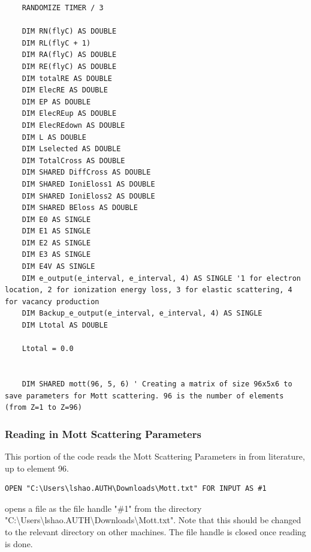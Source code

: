 \documentclass[10pt, reqno]{exam}
\begin{document}
{
\begin{verbatim}
    RANDOMIZE TIMER / 3
    
    DIM RN(flyC) AS DOUBLE
    DIM RL(flyC + 1)
    DIM RA(flyC) AS DOUBLE
    DIM RE(flyC) AS DOUBLE
    DIM totalRE AS DOUBLE
    DIM ElecRE AS DOUBLE
    DIM EP AS DOUBLE
    DIM ElecREup AS DOUBLE
    DIM ElecREdown AS DOUBLE
    DIM L AS DOUBLE
    DIM Lselected AS DOUBLE
    DIM TotalCross AS DOUBLE
    DIM SHARED DiffCross AS DOUBLE
    DIM SHARED IoniEloss1 AS DOUBLE
    DIM SHARED IoniEloss2 AS DOUBLE
    DIM SHARED BEloss AS DOUBLE
    DIM E0 AS SINGLE
    DIM E1 AS SINGLE
    DIM E2 AS SINGLE
    DIM E3 AS SINGLE
    DIM E4V AS SINGLE
    DIM e_output(e_interval, e_interval, 4) AS SINGLE '1 for electron location, 2 for ionization energy loss, 3 for elastic scattering, 4 for vacancy production
    DIM Backup_e_output(e_interval, e_interval, 4) AS SINGLE
    DIM Ltotal AS DOUBLE
    
    Ltotal = 0.0
    
    
    DIM SHARED mott(96, 5, 6) ' Creating a matrix of size 96x5x6 to save parameters for Mott scattering. 96 is the number of elements (from Z=1 to Z=96) 
\end{verbatim}
\subsubsection{Reading in Mott Scattering Parameters}

This portion of the code reads the Mott Scattering Parameters in from literature, up to element 96. \par

\vspace{0.5 cm}

\begin{verbatim}
OPEN "C:\Users\lshao.AUTH\Downloads\Mott.txt" FOR INPUT AS #1
\end{verbatim}

opens a file as the file handle "\#1" from the directory "C:\textbackslash Users\textbackslash lshao.AUTH\textbackslash Downloads\textbackslash Mott.txt". Note that this should be changed to the relevant directory on other machines. The file handle is closed once reading is done.


}
\end{document}
